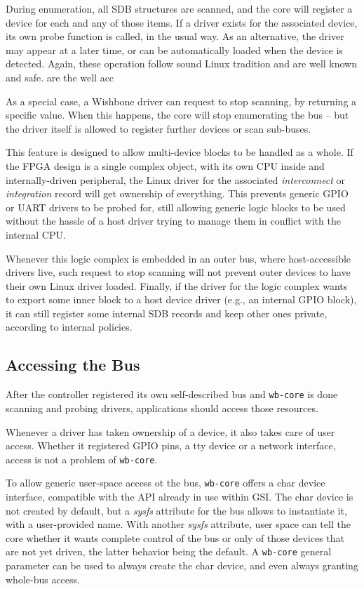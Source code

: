 \documentclass[a4paper, 12pt]{article}
\begin{document}
During enumeration, all SDB structures are scanned, and the core will
register a device for each and any of those items.  If a driver exists
for the associated device, its own probe function is called, in the
usual way.  As an alternative, the driver may appear at a later time,
or can be automatically loaded when the device is detected. Again, these
operation follow sound Linux tradition and are well known and safe.
are the well acc

As a special case, a Wishbone driver can request to stop scanning, by
returning a specific value.  When this happens, the core will stop
enumerating the bus -- but the driver itself is allowed to register
further devices or scan sub-buses.

This feature is designed to allow multi-device blocks to be handled as
a whole.  If the FPGA design is a single complex object, with its own
CPU inside and internally-driven peripheral, the Linux driver for the
associated \textit{interconnect} or \textit{integration} record will
get ownership of everything.  This prevents generic GPIO or UART
drivers to be probed for, still allowing generic logic blocks to be
used without the hassle of a host driver trying to manage them
in conflict with the internal CPU.

Whenever this logic complex is embedded in an outer bus, where
host-accessible drivers live, such request to stop scanning will not
prevent outer devices to have their own Linux driver loaded.  Finally,
if the driver for the logic complex wants to export some inner block
to a host device driver (e.g., an internal GPIO block), it can still
register some internal SDB records and keep other ones private,
according to internal policies.


\subsection{Accessing the Bus}

After the controller registered its own self-described bus and
\texttt{wb-core} is done scanning and probing drivers, applications
should access those resources.

Whenever a driver has taken ownership of a device, it also takes
care of user access. Whether it registered GPIO pins, a tty device
or a network interface, access is not a problem of \texttt{wb-core}.

To allow generic user-space access ot the bus, \texttt{wb-core} offers
a char device interface, compatible with the API already in use within
GSI.  The char device is not created by default, but a \textit{sysfs}
attribute for the bus allows to instantiate it, with a user-provided
name.  With another \textit{sysfs} attribute, user space can tell the
core whether it wants complete control of the bus or only of those
devices that are not yet driven, the latter behavior being the
default.  A \texttt{wb-core} general parameter can be used to always
create the char device, and even always granting whole-bus access.
\end{document}
